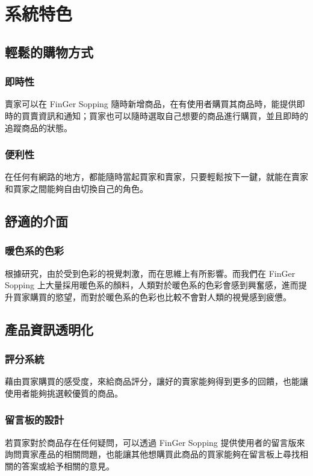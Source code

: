 \documentclass{scrreprt}
\begin{document}
\begin{CJK}{UTF8}{bkai}
\chapter{系統特色}
\section{輕鬆的購物方式}

\subsection{即時性}
\qquad 賣家可以在 FinGer Sopping 隨時新增商品，在有使用者購買其商品時，能提供即時的買賣資訊和通知；買家也可以隨時選取自己想要的商品進行購買，並且即時的追蹤商品的狀態。

\subsection{便利性}
\qquad 在任何有網路的地方，都能隨時當起買家和賣家，只要輕鬆按下一鍵，就能在賣家和買家之間能夠自由切換自己的角色。


\section{舒適的介面}

\subsection{暖色系的色彩}
\qquad 根據研究，由於受到色彩的視覺刺激，而在思維上有所影響。而我們在 FinGer Sopping 上大量採用暖色系的顏料，人類對於暖色系的色彩會感到興奮感，進而提升買家購買的慾望，而對於暖色系的色彩也比較不會對人類的視覺感到疲憊。

\section{產品資訊透明化}
\subsection{評分系統}
\qquad 藉由買家購買的感受度，來給商品評分，讓好的賣家能夠得到更多的回饋，也能讓使用者能夠挑選較優質的商品。

\subsection{留言板的設計}
\qquad 若買家對於商品存在任何疑問，可以透過 FinGer Sopping 提供使用者的留言版來詢問賣家產品的相關問題，也能讓其他想購買此商品的買家能夠在留言板上尋找相關的答案或給予相關的意見。
\chapter{}
\end{CJK}
\end{document}
